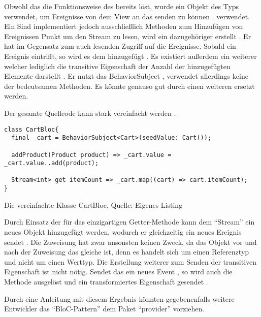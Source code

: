 Obwohl das  die Funktionsweise des  bereits löst,
wurde ein Objekt des Typs  verwendet,
um Ereignisse von dem View an das  senden zu können .  verwendet.
Ein Sind implementiert jedoch ausschließlich Methoden zum Hinzufügen von Ereignissen Punkt um den Stream zu lesen,
wird ein  dazugehöriger  erstellt .
Er hat im Gegensatz zum  auch lesenden Zugriff auf die Ereignisse.
Sobald ein Ereignis eintrifft,
so wird es dem   hinzugefügt .
Es existiert außerdem ein weiterer   welcher lediglich die transitive Eigenschaft der Anzahl der hinzugefügten Elemente darstellt . 
Er nutzt das BehaviorSubject ,
verwendet allerdings keine der bedeutsamen Methoden.
Es könnte genauso gut durch einen weiteren  ersetzt werden.

Der gesamte Quellcode kann stark vereinfacht werden \Lst{\ref{lst:CartBlocVereinfacht}}.
\ifIncludeFigures
  \begin{listing}[h]
    \begin{verbatim}
class CartBloc{
  final _cart = BehaviorSubject<Cart>(seedValue: Cart());

  addProduct(Product product) => _cart.value = _cart.value..add(product);

  Stream<int> get itemCount => _cart.map((cart) => cart.itemCount);
}
\end{verbatim}
    \caption[Die vereinfachte Klasse CartBloc]{Die vereinfachte Klasse CartBloc, Quelle: Eigenes Listing}
    \label{lst:CartBlocVereinfacht}
  \end{listing}
\fi

Durch Einsatz der für das  einzigartigen Getter-Methode  kann dem \enquote{Stream} ein neues Objekt hinzugefügt werden,
wodurch er gleichzeitig ein neues Ereignis sendet .
Die Zuweisung hat zwar ansonsten keinen Zweck,
da das Objekt vor und nach der Zuweisung das gleiche ist,
denn es handelt sich um einen Referenztyp und nicht um einen Werttyp.
Die Erstellung weiterer  zum Senden der transitiven Eigenschaft  ist nicht nötig.
Sendet das   ein neues Event ,
so wird auch die Methode  ausgelöst und ein transformiertes Eigenschaft gesendet .

Durch eine Anleitung mit diesem Ergebnis könnten gegebenenfalls weitere Entwickler das \enquote{BloC-Pattern} dem Paket \enquote{provider} vorziehen.

